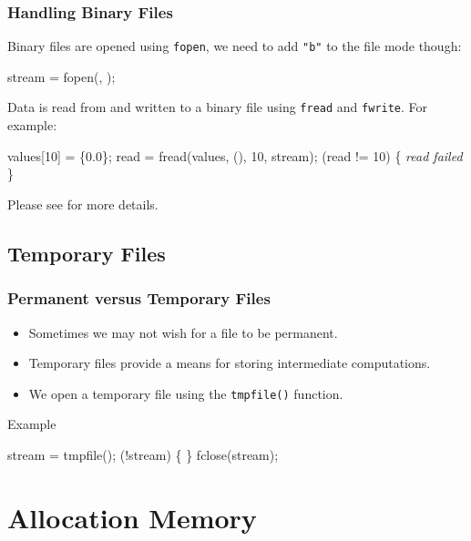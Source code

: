\documentclass[smaller,handout,table]{beamer}
\begin{document}
\begin{frame}[fragile]
\frametitle{Handling Binary Files}
Binary files are opened using {\tt fopen}, we need to add {\tt "b"} to the file mode though:
\begin{semiverbatim}
stream = fopen(, );
\end{semiverbatim}
Data is read from and written to a binary file using {\tt fread} and {\tt fwrite}. For example:
\begin{semiverbatim}
 values[10] = \{0.0\};
read = fread(values, (), 10, stream);
 (read != 10)
\{ \emph{read failed} \}
\end{semiverbatim}
\begin{block}{}
\begin{center}
Please see  for more details.
\end{center}
\end{block}
\end{frame}

\subsection{Temporary Files}
\begin{frame}[fragile]
\frametitle{Permanent versus Temporary Files}
\begin{itemize}
\item Sometimes we may not wish for a file to be permanent.
\item Temporary files provide a means for storing intermediate computations.
\item We open a temporary file using the {\tt tmpfile()} function.
\end{itemize}
\begin{block}{Example}
\begin{semiverbatim}
stream = tmpfile();
 (!stream)
\{
\}
fclose(stream);
\end{semiverbatim}
\end{block}
\end{frame}


\section{Allocation Memory}
\end{document}
